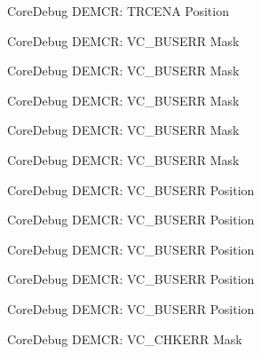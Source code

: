 \begin{DoxyRefList}
\label{deprecated__deprecated000496}%
%
Core\+Debug D\+E\+M\+CR\+: T\+R\+C\+E\+NA Position  
\item[Member \mbox{\hyperlink{group__CMSIS__CoreDebug_ga9d29546aefe3ca8662a7fe48dd4a5b2b}{Core\+Debug\+\_\+\+D\+E\+M\+C\+R\+\_\+\+V\+C\+\_\+\+B\+U\+S\+E\+R\+R\+\_\+\+Msk}} ]\label{deprecated__deprecated000060}%
%
Core\+Debug D\+E\+M\+CR\+: V\+C\+\_\+\+B\+U\+S\+E\+RR Mask 

\label{deprecated__deprecated000204}%
%
Core\+Debug D\+E\+M\+CR\+: V\+C\+\_\+\+B\+U\+S\+E\+RR Mask 

\label{deprecated__deprecated000346}%
%
Core\+Debug D\+E\+M\+CR\+: V\+C\+\_\+\+B\+U\+S\+E\+RR Mask 

\label{deprecated__deprecated000422}%
%
Core\+Debug D\+E\+M\+CR\+: V\+C\+\_\+\+B\+U\+S\+E\+RR Mask 

\label{deprecated__deprecated000511}%
%
Core\+Debug D\+E\+M\+CR\+: V\+C\+\_\+\+B\+U\+S\+E\+RR Mask  
\item[Member \mbox{\hyperlink{group__CMSIS__CoreDebug_gab8e3d8f0f9590a51bbf10f6da3ad6933}{Core\+Debug\+\_\+\+D\+E\+M\+C\+R\+\_\+\+V\+C\+\_\+\+B\+U\+S\+E\+R\+R\+\_\+\+Pos}} ]\label{deprecated__deprecated000059}%
%
Core\+Debug D\+E\+M\+CR\+: V\+C\+\_\+\+B\+U\+S\+E\+RR Position 

\label{deprecated__deprecated000203}%
%
Core\+Debug D\+E\+M\+CR\+: V\+C\+\_\+\+B\+U\+S\+E\+RR Position 

\label{deprecated__deprecated000345}%
%
Core\+Debug D\+E\+M\+CR\+: V\+C\+\_\+\+B\+U\+S\+E\+RR Position 

\label{deprecated__deprecated000421}%
%
Core\+Debug D\+E\+M\+CR\+: V\+C\+\_\+\+B\+U\+S\+E\+RR Position 

\label{deprecated__deprecated000510}%
%
Core\+Debug D\+E\+M\+CR\+: V\+C\+\_\+\+B\+U\+S\+E\+RR Position  
\item[Member \mbox{\hyperlink{group__CMSIS__CoreDebug_ga2f98b461d19746ab2febfddebb73da6f}{Core\+Debug\+\_\+\+D\+E\+M\+C\+R\+\_\+\+V\+C\+\_\+\+C\+H\+K\+E\+R\+R\+\_\+\+Msk}} ]\label{deprecated__deprecated000064}%
%
Core\+Debug D\+E\+M\+CR\+: V\+C\+\_\+\+C\+H\+K\+E\+RR Mask 


\end{DoxyRefList}
